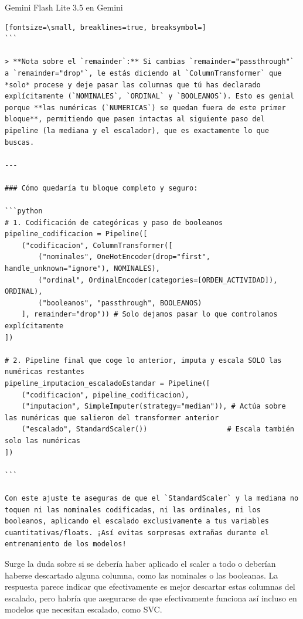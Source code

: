 \documentclass[12pt,a4paper,oneside]{book}
\begin{document}
\begin{iaresp}{Gemini Flash Lite 3.5 en Gemini}
\begin{Verbatim}[fontsize=\small, breaklines=true, breaksymbol=]
```

> **Nota sobre el `remainder`:** Si cambias `remainder="passthrough"` a `remainder="drop"`, le estás diciendo al `ColumnTransformer` que *solo* procese y deje pasar las columnas que tú has declarado explícitamente (`NOMINALES`, `ORDINAL` y `BOOLEANOS`). Esto es genial porque **las numéricas (`NUMERICAS`) se quedan fuera de este primer bloque**, permitiendo que pasen intactas al siguiente paso del pipeline (la mediana y el escalador), que es exactamente lo que buscas.

---

### Cómo quedaría tu bloque completo y seguro:

```python
# 1. Codificación de categóricas y paso de booleanos
pipeline_codificacion = Pipeline([
    ("codificacion", ColumnTransformer([
        ("nominales", OneHotEncoder(drop="first", handle_unknown="ignore"), NOMINALES),
        ("ordinal", OrdinalEncoder(categories=[ORDEN_ACTIVIDAD]), ORDINAL),
        ("booleanos", "passthrough", BOOLEANOS)
    ], remainder="drop")) # Solo dejamos pasar lo que controlamos explícitamente
])

# 2. Pipeline final que coge lo anterior, imputa y escala SOLO las numéricas restantes
pipeline_imputacion_escaladoEstandar = Pipeline([
    ("codificacion", pipeline_codificacion),
    ("imputacion", SimpleImputer(strategy="median")), # Actúa sobre las numéricas que salieron del transformer anterior
    ("escalado", StandardScaler())                   # Escala también solo las numéricas
])

```

Con este ajuste te aseguras de que el `StandardScaler` y la mediana no toquen ni las nominales codificadas, ni las ordinales, ni los booleanos, aplicando el escalado exclusivamente a tus variables cuantitativas/floats. ¡Así evitas sorpresas extrañas durante el entrenamiento de los modelos!
\end{Verbatim}
\end{iaresp}
\begin{iaanalisis}
Surge la duda sobre si se debería haber aplicado el scaler a todo o deberían haberse descartado alguna columna, como las nominales o las booleanas. La respuesta parece indicar que efectivamente es mejor descartar estas columnas del escalado, pero habría que asegurarse de que efectivamente funciona así incluso en modelos que necesitan escalado, como SVC. 
\end{iaanalisis}
\end{document}
